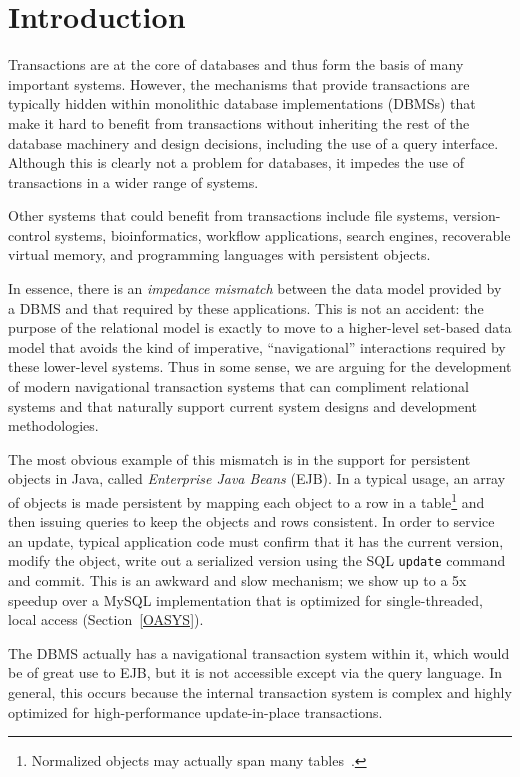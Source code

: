 \documentclass[10pt,letterpaper,twocolumn,english]{article}
\begin{document}
\vspace*{-18pt}


\section{Introduction}

Transactions are at the core of databases and thus form the basis of many
important systems. However, the mechanisms that provide transactions are
typically hidden within monolithic database implementations (DBMSs) that make
it hard to benefit from transactions without inheriting the rest of
the database machinery and design decisions, including the use of a
query interface.  Although this is clearly not a problem for
databases, it impedes the use of transactions in a wider range of
systems.

Other systems that could benefit from transactions include file
systems, version-control systems, bioinformatics, workflow
applications, search engines, recoverable virtual memory, and
programming languages with persistent objects.

In essence, there is an {\em impedance mismatch}\cite{impedanceMismatch} between the data
model provided by a DBMS and that required by these applications. This is
not an accident: the purpose of the relational model is exactly to
move to a higher-level set-based data model that avoids the kind of
imperative, ``navigational'' interactions required by these lower-level systems.
Thus in some sense, we are arguing for the development of modern
navigational transaction systems that can compliment relational systems 
and that naturally support current system designs and development methodologies.

The most obvious example of this mismatch is in the support for
persistent objects in Java, called {\em Enterprise Java Beans}
(EJB). In a typical usage, an array of objects is made persistent by
mapping each object to a row in a table\footnote{Normalized objects may actually span many tables~\cite{hibernate}.}  and then issuing queries to keep the
objects and rows consistent. In order to service an update, typical application code must confirm that it has the
current version, modify the object, write out a serialized version
using the SQL {\tt update} command and commit.  This is an awkward
and slow mechanism; we show up to a 5x speedup over a MySQL implementation 
that is optimized for single-threaded, local access (Section~\ref{OASYS}).

The DBMS actually has a navigational transaction system within it,
which would be of great use to EJB, but it is not accessible except
via the query language.  In general, this occurs because the internal
transaction system is complex and highly optimized for
high-performance update-in-place transactions.
\end{document}
